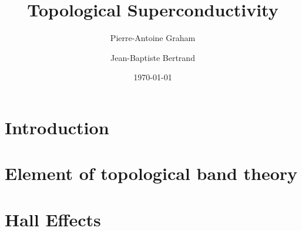 




\title{Topological Superconductivity} 

\author{Pierre-Antoine Graham}
\author{Jean-Baptiste Bertrand}


\date{\today}

\begin{abstract}

\end{abstract}

\maketitle

\tableofcontents

\listoffigures


\section{\label{sec:intro} Introduction}


\section{\label{sec:kramers} Element of topological band theory}


\section{\label{sec:QSH} Hall Effects}


